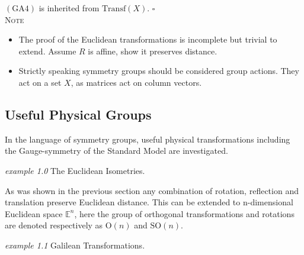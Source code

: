 $(\mathrm{GA}4)$ is inherited from $\mathrm{Transf}(X)$. \hfill $\square$\\
\textsc{Note}
\begin{itemize}
\item The proof of the Euclidean transformations is incomplete but trivial to extend. Assume $R$ is affine, show it preserves distance.
\item Strictly speaking symmetry groups should be considered group actions. They act on a set $X$, as matrices act on column vectors.
\end{itemize}
\subsection{Useful Physical Groups}

In the language of symmetry groups, useful physical transformations including the Gauge-symmetry of the Standard Model are investigated.

\begin{flushleft}\textit{example 1.0} The Euclidean Isometries. \end{flushleft}

As was shown in the previous section any combination of rotation, reflection and translation preserve Euclidean distance. This can be extended to n-dimensional Euclidean space $\mathbb{E}^n$, here the group of orthogonal transformations and rotations are denoted respectively as $\mathrm{O}(n)$ and $\mathrm{SO}(n)$.

\begin{flushleft}\textit{example 1.1} Galilean Transformations.\end{flushleft}

